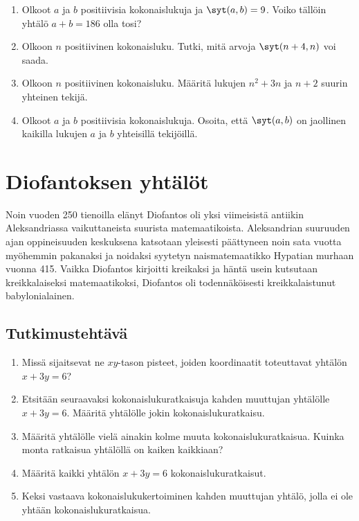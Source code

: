 \begin{enumerate}
\item Olkoot $a$ ja $b$ positiivisia kokonaislukuja ja $\syt(a,b)=9$. Voiko tällöin yhtälö $a + b = 186$ olla tosi?

\item Olkoon $n$ positiivinen kokonaisluku. Tutki, mitä arvoja $\syt(n+4,n)$ voi saada.

\item Olkoon $n$ positiivinen kokonaisluku. Määritä lukujen $n^2 + 3n$ ja $n + 2$ suurin yhteinen tekijä.

\item Olkoot $a$ ja $b$ positiivisia kokonaislukuja. Osoita, että $\syt(a,b)$ on jaollinen kaikilla lukujen $a$ ja $b$ yhteisillä tekijöillä.

\end{enumerate}


\newpage

\section{Diofantoksen yhtälöt}
Noin vuoden 250 tienoilla elänyt Diofantos oli yksi viimeisistä antiikin Aleksandriassa vaikuttaneista suurista matemaatikoista. Aleksandrian suuruuden ajan oppineisuuden keskuksena katsotaan yleisesti päättyneen noin sata vuotta myöhemmin pakanaksi ja noidaksi syytetyn naismatemaatikko Hypatian murhaan vuonna 415. Vaikka Diofantos kirjoitti kreikaksi ja häntä usein kutsutaan kreikkalaiseksi matemaatikoksi, Diofantos oli todennäköisesti kreikkalaistunut babylonialainen. 

\subsection*{Tutkimustehtävä}
\begin{enumerate}
\item Missä sijaitsevat ne $xy$-tason pisteet, joiden koordinaatit toteuttavat yhtälön $x + 3y = 6$?
\item Etsitään seuraavaksi kokonaislukuratkaisuja kahden muuttujan yhtälölle $x + 3y = 6$. Määritä yhtälölle jokin kokonaislukuratkaisu.
\item Määritä yhtälölle vielä ainakin kolme muuta kokonaislukuratkaisua. Kuinka monta ratkaisua yhtälöllä on kaiken kaikkiaan?
\item Määritä kaikki yhtälön $x + 3y = 6$ kokonaislukuratkaisut.
\item Keksi vastaava kokonaislukukertoiminen kahden muuttujan yhtälö, jolla ei ole yhtään kokonaislukuratkaisua.
\end{enumerate}


